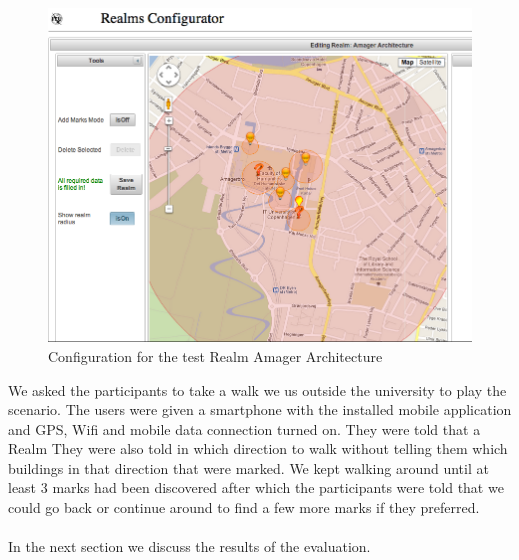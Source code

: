 \begin{figure}[ht]
	\centering
	\includegraphics[width=0.8\linewidth]{fig/amager_configuration}
	\caption{Configuration for the test Realm Amager Architecture}
	\label{fig.amager.arc}
\end{figure}

\noinden We asked the participants to take a walk we us outside the university to play the scenario. The users were given a smartphone with the installed mobile application and GPS, Wifi and mobile data connection turned on. They were told that a Realm They were also told in which direction to walk without telling them which buildings in that direction that were marked. We kept walking around until at least 3 marks had been discovered after which the participants were told that we could go back or continue around to find a few more marks if they preferred.
\\\\
In the next section we discuss the results of the evaluation.

